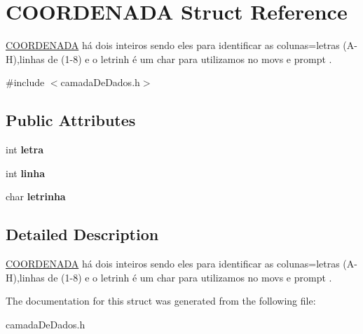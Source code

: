 \hypertarget{structCOORDENADA}{}\section{C\+O\+O\+R\+D\+E\+N\+A\+DA Struct Reference}
\label{structCOORDENADA}


\hyperlink{structCOORDENADA}{C\+O\+O\+R\+D\+E\+N\+A\+DA} há dois inteiros sendo eles para identificar as colunas=letras (A-\/H),linhas de (1-\/8) e o letrinh é um char para utilizamos no movs e prompt .  




{\ttfamily \#include $<$camada\+De\+Dados.\+h$>$}

\subsection*{Public Attributes}
\begin{DoxyCompactItemize}
\item 
\mbox{\label{structCOORDENADA_acb526f8ae91ba6a2742ef1a9473fa2b4}} 
int {\bfseries letra}
\item 
\mbox{\label{structCOORDENADA_aefe14bcc5a066ac3b21500cc3d28c06f}} 
int {\bfseries linha}
\item 
\mbox{\label{structCOORDENADA_ac00ff2e615b371a3d87fbb05449cde99}} 
char {\bfseries letrinha}
\end{DoxyCompactItemize}


\subsection{Detailed Description}
\hyperlink{structCOORDENADA}{C\+O\+O\+R\+D\+E\+N\+A\+DA} há dois inteiros sendo eles para identificar as colunas=letras (A-\/H),linhas de (1-\/8) e o letrinh é um char para utilizamos no movs e prompt . 

The documentation for this struct was generated from the following file\+:\begin{DoxyCompactItemize}
\item 
camada\+De\+Dados.\+h\end{DoxyCompactItemize}
